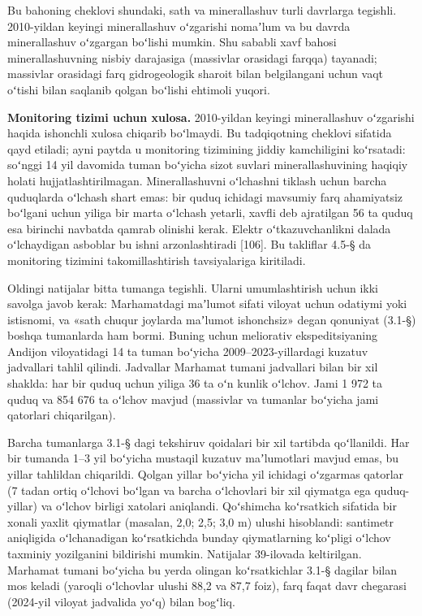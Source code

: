 Bu bahoning cheklovi shundaki, sath va minerallashuv turli davrlarga
tegishli. 2010-yildan keyingi minerallashuv oʻzgarishi nomaʼlum va bu
davrda minerallashuv oʻzgargan boʻlishi mumkin. Shu sababli xavf bahosi
minerallashuvning nisbiy darajasiga (massivlar orasidagi farqqa)
tayanadi; massivlar orasidagi farq gidrogeologik sharoit bilan
belgilangani uchun vaqt oʻtishi bilan saqlanib qolgan boʻlishi ehtimoli
yuqori.

\textbf{Monitoring tizimi uchun xulosa.} 2010-yildan keyingi
minerallashuv oʻzgarishi haqida ishonchli xulosa chiqarib boʻlmaydi. Bu
tadqiqotning cheklovi sifatida qayd etiladi; ayni paytda u monitoring
tizimining jiddiy kamchiligini koʻrsatadi: soʻnggi 14 yil davomida tuman
boʻyicha sizot suvlari minerallashuvining haqiqiy holati
hujjatlashtirilmagan. Minerallashuvni oʻlchashni tiklash uchun barcha
quduqlarda oʻlchash shart emas: bir quduq ichidagi mavsumiy farq
ahamiyatsiz boʻlgani uchun yiliga bir marta oʻlchash yetarli, xavfli deb
ajratilgan 56 ta quduq esa birinchi navbatda qamrab olinishi kerak.
Elektr oʻtkazuvchanlikni dalada oʻlchaydigan asboblar bu ishni
arzonlashtiradi {[}106{]}. Bu takliflar 4.5-§ da monitoring tizimini
takomillashtirish tavsiyalariga kiritiladi.


Oldingi natijalar bitta tumanga tegishli. Ularni umumlashtirish uchun
ikki savolga javob kerak: Marhamatdagi maʼlumot sifati viloyat uchun
odatiymi yoki istisnomi, va «sath chuqur joylarda maʼlumot ishonchsiz»
degan qonuniyat (3.1-§) boshqa tumanlarda ham bormi. Buning uchun
meliorativ ekspeditsiyaning Andijon viloyatidagi 14 ta tuman boʻyicha
2009--2023-yillardagi kuzatuv jadvallari tahlil qilindi. Jadvallar
Marhamat tumani jadvallari bilan bir xil shaklda: har bir quduq uchun
yiliga 36 ta oʻn kunlik oʻlchov. Jami 1 972 ta quduq va 854 676 ta
oʻlchov mavjud (massivlar va tumanlar boʻyicha jami qatorlari
chiqarilgan).

Barcha tumanlarga 3.1-§ dagi tekshiruv qoidalari bir xil tartibda
qoʻllanildi. Har bir tumanda 1--3 yil boʻyicha mustaqil kuzatuv
maʼlumotlari mavjud emas, bu yillar tahlildan chiqarildi. Qolgan yillar
boʻyicha yil ichidagi oʻzgarmas qatorlar (7 tadan ortiq oʻlchovi boʻlgan
va barcha oʻlchovlari bir xil qiymatga ega quduq-yillar) va oʻlchov
birligi xatolari aniqlandi. Qoʻshimcha koʻrsatkich sifatida bir xonali
yaxlit qiymatlar (masalan, 2,0; 2,5; 3,0 m) ulushi hisoblandi: santimetr
aniqligida oʻlchanadigan koʻrsatkichda bunday qiymatlarning koʻpligi
oʻlchov taxminiy yozilganini bildirishi mumkin. Natijalar 39-ilovada
keltirilgan. Marhamat tumani boʻyicha bu yerda olingan koʻrsatkichlar
3.1-§ dagilar bilan mos keladi (yaroqli oʻlchovlar ulushi 88,2 va 87,7
foiz), farq faqat davr chegarasi (2024-yil viloyat jadvalida yoʻq) bilan
bogʻliq.

